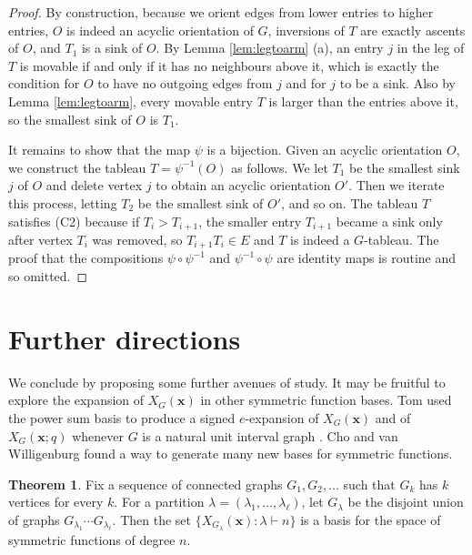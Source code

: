 \documentclass[12pt]{amsart}  %
\theoremstyle{definition}
\newtheorem{theorem}{Theorem}[section]
\theoremstyle{remark}
\numberwithin{equation}{section}
\begin{document}
\begin{proof}
By construction, because we orient edges from lower entries to higher entries, $O$ is indeed an acyclic orientation of $G$, inversions of $T$ are exactly ascents of $O$, and $T_1$ is a sink of $O$. By Lemma \ref{lem:legtoarm} (a), an entry $j$ in the leg of $T$ is movable if and only if it has no neighbours above it, which is exactly the condition for $O$ to have no outgoing edges from $j$ and for $j$ to be a sink. Also by Lemma \ref{lem:legtoarm}, every movable entry $T$ is larger than the entries above it, so the smallest sink of $O$ is $T_1$.

It remains to show that the map $\psi$ is a bijection. Given an acyclic orientation $O$, we construct the tableau $T=\psi^{-1}(O)$ as follows. We let $T_1$ be the smallest sink $j$ of $O$ and  delete vertex $j$ to obtain an acyclic orientation $O'$. Then we iterate this process, letting $T_2$ be the smallest sink of $O'$, and so on. The tableau $T$ satisfies (C2) because if $T_i>T_{i+1}$, the smaller entry $T_{i+1}$ became a sink only after vertex $T_i$ was removed, so $T_{i+1}T_i\in E$ and $T$ is indeed a $G$-tableau. 
The proof that the compositions $\psi\circ \psi^{-1}$ and $\psi^{-1}\circ\psi$ are identity maps is routine and so omitted.
\end{proof}

\section{Further directions}\label{sec:further}

We conclude by proposing some further avenues of study. It may be fruitful to explore the expansion of $X_G(\bm x)$ in other symmetric function bases. Tom used the power sum basis to produce a signed $e$-expansion of $X_G(\bm x)$ \cite[Theorem 5.10]{qforesttriples} and of $X_G(\bm x;q)$ whenever $G$ is a natural unit interval graph \cite[Theorem 3.4]{qforesttriples}. Cho and van Willigenburg found a way to generate many new bases for symmetric functions.

\begin{theorem}
\cite[Theorem 5]{chrombases} Fix a sequence of connected graphs $G_1,G_2,\ldots$ such that $G_k$ has $k$ vertices for every $k$. For a partition $\lambda=(\lambda_1,\ldots,\lambda_\ell)$, let $G_\lambda$ be the disjoint union of graphs $G_{\lambda_1}\cdots G_{\lambda_\ell}$.
Then the set $\{X_{G_\lambda}(\bm x): \lambda\vdash n\}$ is a basis for the space of symmetric functions of degree $n$. 
\end{theorem}
\end{document}
